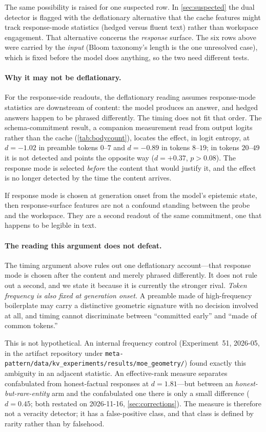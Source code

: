 \documentclass[11pt,a4paper]{article}
\begin{document}
The same possibility is raised for one suspected row. In
\cref{sec:suspected} the dual detector is flagged with the deflationary
alternative that the cache features might track response-mode statistics
(hedged versus fluent text) rather than workspace engagement. That
alternative concerns the \emph{response} surface. The six rows above
were carried by the \emph{input} (Bloom taxonomy's length is the one
unresolved case), which is fixed before the model does anything, so
the two need different tests.

\paragraph{Why it may not be deflationary.}
For the response-side readouts, the deflationary reading assumes
response-mode statistics are downstream of content: the model produces
an answer, and hedged answers happen to be phrased differently. The
timing does not fit that order. The schema-commitment result, a
companion measurement read from output logits rather than the cache
(\cref{tab:bodycount}), locates the effect, in logit entropy, at $d{=}{-}1.02$ in preamble tokens $0$--$7$
and $d{=}{-}0.89$ in tokens $8$--$19$; in tokens $20$--$49$ it is not
detected and points the opposite way ($d{=}{+}0.37$, $p>0.08$). The
response mode is selected \emph{before} the content that would justify
it, and the effect is no longer detected by the time the content
arrives.

If response mode is chosen at generation onset from the model's
epistemic state, then response-surface features are not a confound
standing between the probe and the workspace. They are a second
readout of the same commitment, one that happens to be legible in text.

\paragraph{The reading this argument does not defeat.}
The timing argument above rules out one deflationary account---that response
mode is chosen after the content and merely phrased differently. It does not
rule out a second, and we state it because it is currently the stronger
rival. \emph{Token frequency is also fixed at generation onset.} A preamble
made of high-frequency boilerplate may carry a distinctive geometric
signature with no decision involved at all, and timing cannot discriminate
between ``committed early'' and ``made of common tokens.''

This is not hypothetical. An internal frequency control (Experiment~51,
2026-05, in the artifact repository under
\nolinkurl{meta-pattern/data/kv_experiments/results/moe_geometry/}) found exactly this ambiguity in an adjacent statistic. An
effective-rank measure separates confabulated from honest-factual responses
at $d = 1.81$---but between an \emph{honest-but-rare-entity} arm and
the confabulated one there is only a small difference ($d = 0.45$; both
restated on 2026-11-16, \cref{sec:corrections}). The measure is
therefore not a veracity detector; it has a false-positive class, and that
class is defined by rarity rather than by falsehood.
\end{document}
